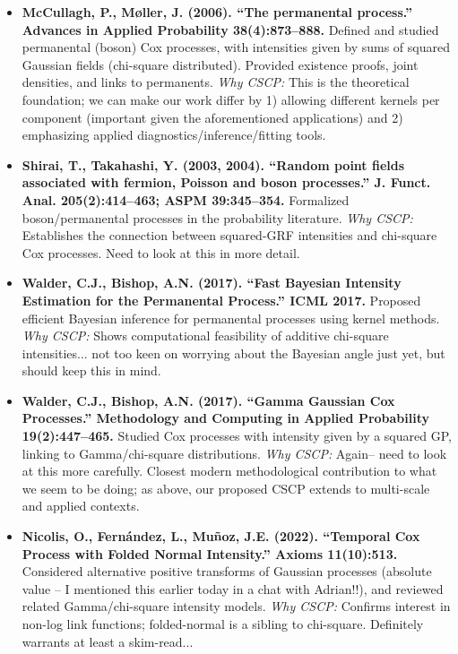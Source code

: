 \documentclass[11pt]{article}
\begin{document}
	\begin{itemize}
		\item \textbf{McCullagh, P., Møller, J. (2006). ``The permanental process.'' Advances in Applied Probability 38(4):873--888.}  
		Defined and studied permanental (boson) Cox processes, with intensities given by sums of squared Gaussian fields (chi-square distributed). Provided existence proofs, joint densities, and links to permanents.  
		\emph{Why CSCP:} This is the theoretical foundation; we can make our work differ by 1) allowing different kernels per component (important given the aforementioned applications) and 2) emphasizing applied diagnostics/inference/fitting tools.
		
		\item \textbf{Shirai, T., Takahashi, Y. (2003, 2004). ``Random point fields associated with fermion, Poisson and boson processes.'' J. Funct. Anal. 205(2):414--463; ASPM 39:345--354.}  
		Formalized boson/permanental processes in the probability literature.  
		\emph{Why CSCP:} Establishes the connection between squared-GRF intensities and chi-square Cox processes. Need to look at this in more detail.
		
		\item \textbf{Walder, C.J., Bishop, A.N. (2017). ``Fast Bayesian Intensity Estimation for the Permanental Process.'' ICML 2017.}  
		Proposed efficient Bayesian inference for permanental processes using kernel methods.  
		\emph{Why CSCP:} Shows computational feasibility of additive chi-square intensities... not too keen on worrying about the Bayesian angle just yet, but should keep this in mind.
		
		\item \textbf{Walder, C.J., Bishop, A.N. (2017). ``Gamma Gaussian Cox Processes.'' Methodology and Computing in Applied Probability 19(2):447--465.}  
		Studied Cox processes with intensity given by a squared GP, linking to Gamma/chi-square distributions.  
		\emph{Why CSCP:} Again-- need to look at this more carefully. Closest modern methodological contribution to what we seem to be doing; as above, our proposed CSCP extends to multi-scale and applied contexts.
		
		\item \textbf{Nicolis, O., Fernández, L., Muñoz, J.E. (2022). ``Temporal Cox Process with Folded Normal Intensity.'' Axioms 11(10):513.}  
		Considered alternative positive transforms of Gaussian processes (absolute value -- I mentioned this earlier today in a chat with Adrian!!), and reviewed related Gamma/chi-square intensity models.  
		\emph{Why CSCP:} Confirms interest in non-log link functions; folded-normal is a sibling to chi-square. Definitely warrants at least a skim-read...
	\end{itemize}
	
\end{document}
